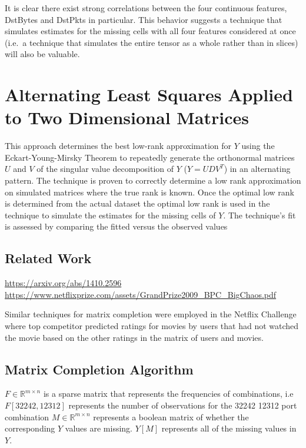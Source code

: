 \documentclass[12pt,twoside]{dukestatscithesis}
\theoremstyle{definition}
\theoremstyle{definition}
\theoremstyle{definition}
\theoremstyle{remark}
\begin{document}
It is clear there exist strong correlations between the four continuous
features, DstBytes and DstPkts in particular. This behavior suggests a
technique that simulates estimates for the missing cells with all four
features considered at once (i.e.~a technique that simulates the entire
tensor as a whole rather than in slices) will also be valuable.

\chapter{Alternating Least Squares Applied to Two Dimensional
Matrices}\label{alternating-least-squares-applied-to-two-dimensional-matrices}

This approach determines the best low-rank approximation for \(Y\) using
the Eckart-Young-Mirsky Theorem to repeatedly generate the orthonormal
matrices \(U\) and \(V\) of the singular value decomposition of \(Y\)
(\(Y = UDV^T\)) in an alternating pattern. The technique is proven to
correctly determine a low rank approximation on simulated matrices where
the true rank is known. Once the optimal low rank is determined from the
actual dataset the optimal low rank is used in the technique to simulate
the estimates for the missing cells of \(Y\). The technique's fit is
assessed by comparing the fitted versus the observed values

\section{Related Work}\label{related-work}

\url{https://arxiv.org/abs/1410.2596}
\url{https://www.netflixprize.com/assets/GrandPrize2009_BPC_BigChaos.pdf}

Similar techniques for matrix completion were employed in the Netflix
Challenge where top competitor predicted ratings for movies by users
that had not watched the movie based on the other ratings in the matrix
of users and movies.

\section{Matrix Completion Algorithm}\label{matrix-completion-algorithm}

\(F \in \mathbb{R}^{m \times n}\) is a sparse matrix that represents the
frequencies of combinations, i.e \(F[32242,12312]\) represents the
number of observations for the 32242 12312 port combination
\(M \in \mathbb{R}^{m \times n}\) represents a boolean matrix of whether
the corresponding \(Y\) values are missing. \(Y[M]\) represents all of
the missing values in \(Y\).
\end{document}
